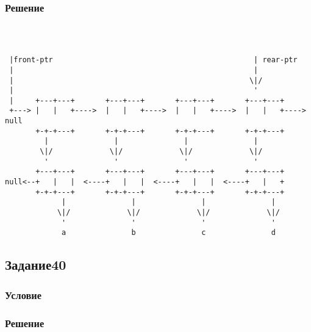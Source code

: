\documentclass[10pt,a4paper]{article}
\begin{document}
\subsubsection*{Решение}
\begin{lstlisting}


                                                          
 |front-ptr                                              | rear-ptr
 |                                                       |
 |                                                      \|/ 
 |                                                       '
 |     +---+---+       +---+---+       +---+---+       +---+---+
 +---> |   |   +---->  |   |   +---->  |   |   +---->  |   |   +---->  null
       +-+-+---+       +-+-+---+       +-+-+---+       +-+-+---+
         |               |               |               |
        \|/             \|/             \|/             \|/
         '               '               '               '
       +---+---+       +---+---+       +---+---+       +---+---+
null<--+   |   |  <----+   |   |  <----+   |   |  <----+   |   +
       +-+-+---+       +-+-+---+       +-+-+---+       +-+-+---+
             |               |               |               |
            \|/             \|/             \|/             \|/
             '               '               '               '
             a               b               c               d

\end{lstlisting}

\subsection*{Задание40}
\subsubsection*{Условие}
\subsubsection*{Решение}
\begin{lstlisting}
\end{lstlisting}
\end{document}
